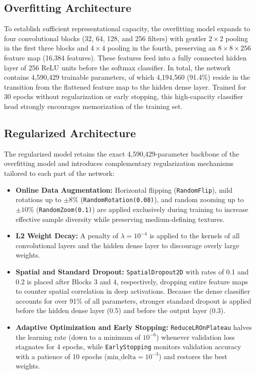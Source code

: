 \documentclass[11pt, a4paper]{article}
\begin{document}
\subsection{Overfitting Architecture}
To establish sufficient representational capacity, the overfitting model expands to four convolutional blocks (32, 64, 128, and 256 filters) with gentler $2 \times 2$ pooling in the first three blocks and $4 \times 4$ pooling in the fourth, preserving an $8 \times 8 \times 256$ feature map (16,384 features). These features feed into a fully connected hidden layer of 256 ReLU units before the softmax classifier. In total, the network contains 4,590,429 trainable parameters, of which 4,194,560 (91.4\%) reside in the transition from the flattened feature map to the hidden dense layer. Trained for 30 epochs without regularization or early stopping, this high-capacity classifier head strongly encourages memorization of the training set.

\subsection{Regularized Architecture}
The regularized model retains the exact 4,590,429-parameter backbone of the overfitting model and introduces complementary regularization mechanisms tailored to each part of the network:
\begin{itemize}
    \item \textbf{Online Data Augmentation:} Horizontal flipping (\texttt{RandomFlip}), mild rotations up to $\pm 8\%$ (\texttt{RandomRotation(0.08)}), and random zooming up to $\pm 10\%$ (\texttt{RandomZoom(0.1)}) are applied exclusively during training to increase effective sample diversity while preserving medium-defining textures.
    \item \textbf{L2 Weight Decay:} A penalty of $\lambda = 10^{-4}$ is applied to the kernels of all convolutional layers and the hidden dense layer to discourage overly large weights.
    \item \textbf{Spatial and Standard Dropout:} \texttt{SpatialDropout2D} with rates of 0.1 and 0.2 is placed after Blocks 3 and 4, respectively, dropping entire feature maps to counter spatial correlation in deep activations. Because the dense classifier accounts for over 91\% of all parameters, stronger standard dropout is applied before the hidden dense layer (0.5) and before the output layer (0.3).
    \item \textbf{Adaptive Optimization and Early Stopping:} \texttt{ReduceLROnPlateau} halves the learning rate (down to a minimum of $10^{-6}$) whenever validation loss stagnates for 4 epochs, while \texttt{EarlyStopping} monitors validation accuracy with a patience of 10 epochs ($\text{min\_delta} = 10^{-3}$) and restores the best weights.
\end{itemize}
\end{document}
